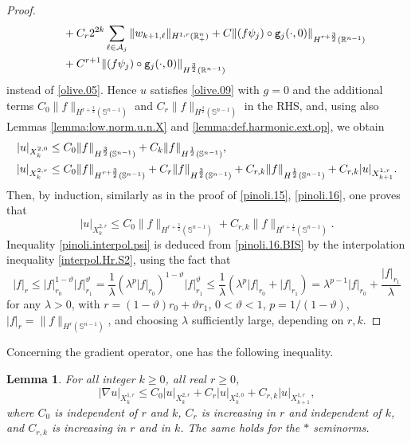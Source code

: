 \documentclass[10pt,reqno,a4paper]{article}
\numberwithin{equation}{section}
\theoremstyle{plain}
\newtheorem{lemma}[theorem]{Lemma}
\theoremstyle{definition}
\newcommand{\R}{{\mathbb R}}
\renewcommand{\S}{{\mathbb S}}
\newcommand{\mA}{\mathcal{A}}
\newcommand{\lm}{\lambda}
\renewcommand{\th}{\vartheta}
\newcommand{\grad}{\nabla}
\begin{document}
\begin{proof}
\begin{align}
& \quad \ 
+ C_r 2^{2k} \sum_{\ell \in \mA_j} \| w_{k+1, \ell} \|_{H^{1,r}(\R^n_+)}
+ C \| (f \psi_j) \circ \mathtt g_j(\cdot, 0) \|_{H^{r+\frac32}(\R^{n-1})}
\notag \\ 
& \quad \ 
+ C^{r+1} \| (f \psi_j) \circ \mathtt g_j(\cdot, 0) \|_{H^{\frac32}(\R^{n-1})}
\label{pinoli.05.BIS}
\end{align}
instead of \eqref{olive.05}. 
Hence $u$ satisfies \eqref{olive.09} with $g = 0$ and the additional terms 
$C_0 \| f \|_{H^{r+\frac32}(\S^{n-1})}$ and  
$C_r \| f \|_{H^{\frac32}(\S^{n-1})}$ 
in the RHS, and, using also Lemmas \ref{lemma:low.norm.u.n.X} and \ref{lemma:def.harmonic.ext.op}, 
we obtain 
\begin{align}
|u|_{X^{2,0}_k}
& \leq 
C_0 \| f \|_{H^{\frac32}(\S^{n-1})}
+ C_k \| f \|_{H^{\frac12}(\S^{n-1})},
\notag \\
|u|_{X^{2,r}_k}
& \leq 
C_0 \| f \|_{H^{r + \frac32}(\S^{n-1})}
+ C_r \| f \|_{H^{\frac32}(\S^{n-1})}
+ C_{r,k} \| f \|_{H^{\frac12}(\S^{n-1})}
+ C_{r,k} |u|_{X^{1,r}_{k+1}}.
\label{pinoli.12.BIS}
\end{align}
Then, by induction, similarly as in the proof of \eqref{pinoli.15}, \eqref{pinoli.16}, 
one proves that 
\begin{equation} \label{pinoli.16.BIS}
|u|_{X^{2,r}_k} 
\leq C_0 \| f \|_{H^{r + \frac32}(\S^{n-1})} 
+ C_{r,k} \| f \|_{H^{r + \frac12}(\S^{n-1})}.
\end{equation}
Inequality \eqref{pinoli.interpol.psi} is deduced from \eqref{pinoli.16.BIS} 
by the interpolation inequality \eqref{interpol.Hr.S2}, 
using the fact that 
\begin{equation} \label{interpol.trick}
|f|_r 
\leq |f|_{r_0}^{1-\th} |f|_{r_1}^\th 
= \frac{1}{\lm} (\lm^p |f|_{r_0})^{1-\th} |f|_{r_1}^\th
\leq \frac{1}{\lm} ( \lm^p |f|_{r_0} + |f|_{r_1} ) 
= \lm^{p-1} |f|_{r_0} + \frac{|f|_{r_1}}{\lm}  
\end{equation}
for any $\lm>0$, 
with $r = (1-\th) r_0 + \th r_1$, $0<\th<1$, $p = 1/(1-\th)$, 
$|f|_r = \| f \|_{H^r(\S^{n-1})}$, 
and choosing $\lm$ sufficiently large, depending on $r,k$. 
\end{proof}


Concerning the gradient operator, one has the following inequality. 

\begin{lemma} \label{lemma:pinoli.grad}
For all integer $k \geq 0$, all real $r \geq 0$, 
\begin{equation} \label{pinoli.grad}
|\grad u|_{X^{1,r}_k} \leq C_0 |u|_{X^{2,r}_k} +  C_r |u|_{X^{2,0}_k} + C_{r,k} |u|_{X^{1,r}_{k+1}},
\end{equation}
where $C_0$ is independent of $r$ and $k$, 
$C_r$ is increasing in $r$ and independent of $k$, 
and $C_{r,k}$ is increasing in $r$ and in $k$.
The same holds for the $*$ seminorms. 
\end{lemma}
\end{document}
